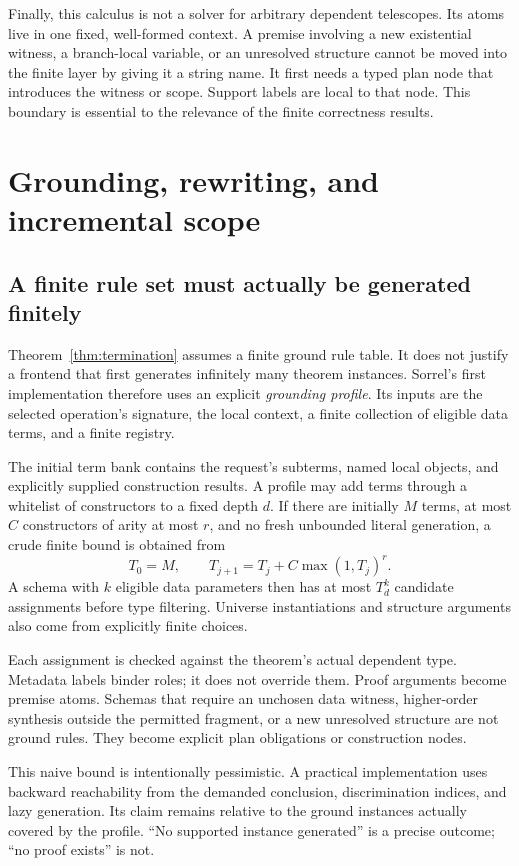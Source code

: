 \documentclass[11pt,a4paper]{article}
\numberwithin{equation}{section}
\theoremstyle{definition}\newtheorem{definition}[theorem]{Definition}
\theoremstyle{remark}\newtheorem{remark}[theorem]{Remark}
\begin{document}
Finally, this calculus is not a solver for arbitrary dependent telescopes.
Its atoms live in one fixed, well-formed context. A premise involving a new
existential witness, a branch-local variable, or an unresolved structure cannot
be moved into the finite layer by giving it a string name. It first needs a
typed plan node that introduces the witness or scope. Support labels are local
to that node. This boundary is essential to the relevance of the finite
correctness results.

\section{Grounding, rewriting, and incremental scope}\label{sec:grounding}

\subsection{A finite rule set must actually be generated finitely}
Theorem~\ref{thm:termination} assumes a finite ground rule table. It does not
justify a frontend that first generates infinitely many theorem instances.
Sorrel's first implementation therefore uses an explicit \emph{grounding
profile}. Its inputs are the selected operation's signature, the local
context, a finite collection of eligible data terms, and a finite registry.

The initial term bank contains the request's subterms, named local objects,
and explicitly supplied construction results. A profile may add terms through
a whitelist of constructors to a fixed depth \(d\). If there are initially
\(M\) terms, at most \(C\) constructors of arity at most \(r\), and no fresh
unbounded literal generation, a crude finite bound is obtained from
\[
 T_0=M,\qquad T_{j+1}=T_j+C\max(1,T_j)^r.
\]
A schema with \(k\) eligible data parameters then has at most \(T_d^k\)
candidate assignments before type filtering. Universe instantiations and
structure arguments also come from explicitly finite choices.

Each assignment is checked against the theorem's actual dependent type.
Metadata labels binder roles; it does not override them. Proof arguments
become premise atoms. Schemas that require an unchosen data witness, higher-order
synthesis outside the permitted fragment, or a new unresolved structure are
not ground rules. They become explicit plan obligations or construction nodes.

This naive bound is intentionally pessimistic. A practical implementation uses
backward reachability from the demanded conclusion, discrimination indices,
and lazy generation. Its claim remains relative to the ground instances
actually covered by the profile. ``No supported instance generated'' is a
precise outcome; ``no proof exists'' is not.
\end{document}
